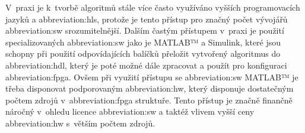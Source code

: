 \documentclass[a4paper, twoside, 11pt]{article}
\begin{document}
		V~praxi je k~tvorbě algoritmů stále více často využíváno vyšších programovacích jazyků a \gls{abbreviation:hls}, protože je tento přístup pro značný počet vývojářů \gls{abbreviation:sw} srozumitelnější. Dalším častým přístupem v~praxi je použití specializovaných \gls{abbreviation:sw} jako je MATLAB™️ a Simulink, které jsou schopny při použití odpovídajících balíčků přeložit vytvořený algoritmus do \gls{abbreviation:hdl}, který je poté možné dále zpracovat a použít pro konfiguraci \gls{abbreviation:fpga}. Ovšem při využití přístupu se \gls{abbreviation:sw} MATLAB™️ je třeba disponovat podporovaným \gls{abbreviation:hw}, který disponuje dostatečným počtem zdrojů v~\gls{abbreviation:fpga} struktuře. Tento přístup je značně finančně náročný v~ohledu licence \gls{abbreviation:sw} a taktéž vlivem vyšší ceny \gls{abbreviation:hw} s~větším počtem zdrojů.
\end{document}
